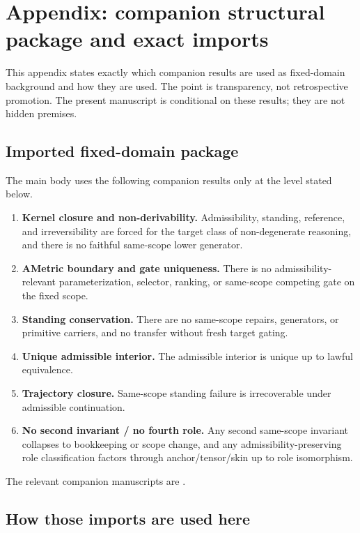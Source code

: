 \section{Appendix: companion structural package and exact imports}
\label{app:later-architecture}

This appendix states exactly which companion results are used as fixed-domain background and how
they are used. The point is transparency, not retrospective promotion. The present manuscript is
conditional on these results; they are not hidden premises.

\subsection{Imported fixed-domain package}

The main body uses the following companion results only at the level stated below.
\begin{enumerate}
    \item \textbf{Kernel closure and non-derivability.} Admissibility, standing, reference, and
    irreversibility are forced for the target class of non-degenerate reasoning, and there is no
    faithful same-scope lower generator.
    \item \textbf{AMetric boundary and gate uniqueness.} There is no admissibility-relevant
    parameterization, selector, ranking, or same-scope competing gate on the fixed scope.
    \item \textbf{Standing conservation.} There are no same-scope repairs, generators, or primitive
    carriers, and no transfer without fresh target gating.
    \item \textbf{Unique admissible interior.} The admissible interior is unique up to lawful
    equivalence.
    \item \textbf{Trajectory closure.} Same-scope standing failure is irrecoverable under admissible
    continuation.
    \item \textbf{No second invariant / no fourth role.} Any second same-scope invariant collapses to
    bookkeeping or scope change, and any admissibility-preserving role classification factors
    through anchor/tensor/skin up to role isomorphism.
\end{enumerate}
The relevant companion manuscripts are
\citep{maley_foundational2026,maley_necessity2026,maley_trajectory2026,maley_unus2026,
maley_clausura2026,maley_ats2026,maley_ametric2026,maley_structura2026}.

\subsection{How those imports are used here}

